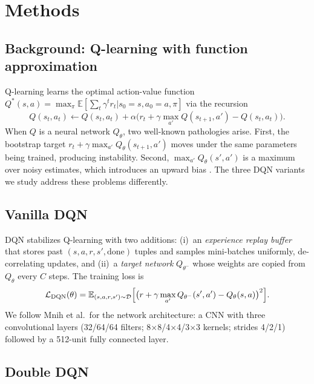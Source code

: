 \documentclass[12pt]{article}
\begin{document}
\section{Methods}

\subsection{Background: Q-learning with function approximation}

Q-learning learns the optimal action-value function
$Q^{*}(s,a) = \max_{\pi}\mathbb{E}[\sum_{t}\gamma^{t}r_{t}|s_{0}=s,a_{0}=a,\pi]$
via the recursion
\begin{equation}
Q(s_{t},a_{t}) \leftarrow Q(s_{t},a_{t}) + \alpha\bigl(r_{t} + \gamma\max_{a'}Q(s_{t+1},a') - Q(s_{t},a_{t})\bigr).
\label{eq:qlearning}
\end{equation}
When $Q$ is a neural network $Q_{\theta}$, two well-known pathologies arise.
First, the bootstrap target $r_{t}+\gamma\max_{a'}Q_{\theta}(s_{t+1},a')$
moves under the same parameters being trained, producing instability.
Second, $\max_{a'}Q_{\theta}(s',a')$ is a maximum over noisy estimates, which
introduces an upward bias \citep{thrun1993issues}. The three DQN variants we
study address these problems differently.

\subsection{Vanilla DQN}

DQN \citep{mnih2015human} stabilizes Q-learning with two additions:
(i)~an \emph{experience replay buffer} that stores past
$(s,a,r,s',\text{done})$ tuples and samples mini-batches uniformly,
de-correlating updates, and (ii)~a \emph{target network} $Q_{\theta^{-}}$
whose weights are copied from $Q_{\theta}$ every $C$ steps. The training
loss is
\begin{equation}
\mathcal{L}_{\text{DQN}}(\theta) = \mathbb{E}_{(s,a,r,s')\sim\mathcal{D}}\Bigl[\bigl(r + \gamma\max_{a'}Q_{\theta^{-}}(s',a') - Q_{\theta}(s,a)\bigr)^{2}\Bigr].
\label{eq:dqn}
\end{equation}
We follow Mnih et al.~for the network architecture: a CNN with three
convolutional layers (32/64/64 filters; 8$\times$8/4$\times$4/3$\times$3
kernels; strides 4/2/1) followed by a 512-unit fully connected layer.

\subsection{Double DQN}
\end{document}
